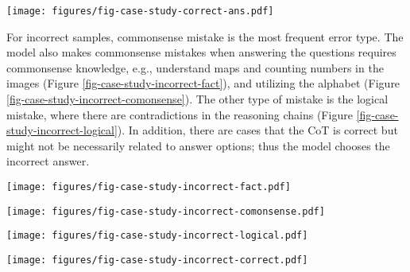 \documentclass[nohyperref]{article}
\theoremstyle{plain}
\theoremstyle{definition}
\theoremstyle{remark}
\begin{document}
\begin{figure*}[htb]
  \begin{center}
   \texttt{[image: figures/fig-case-study-correct-ans.pdf]}
  \end{center}
\caption{Examples of answers are correct while the CoT is correct (a) or incorrect (b).}
\label{fig-case-study-correct-ans}
\end{figure*}

For incorrect samples, commonsense mistake is the most frequent error type. The model also makes commonsense mistakes when answering the questions requires commonsense knowledge, e.g., understand maps and counting numbers in the images (Figure \ref{fig-case-study-incorrect-fact}), and utilizing the alphabet (Figure \ref{fig-case-study-incorrect-comonsense}). The other type of mistake is the logical mistake, where there are contradictions in the reasoning chains (Figure \ref{fig-case-study-incorrect-logical}). In addition, there are cases that the CoT is correct but might not be necessarily related to answer options; thus the model chooses the incorrect answer.

\begin{figure*}[htb]
  \begin{center}
   \texttt{[image: figures/fig-case-study-incorrect-fact.pdf]}
  \end{center}
\caption{Examples of commonsense mistakes about understanding maps and counting numbers.}
\label{fig-case-study-incorrect-fact}
\end{figure*}

\begin{figure*}[htb]
  \begin{center}
   \texttt{[image: figures/fig-case-study-incorrect-comonsense.pdf]}
  \end{center}
\caption{Examples of commonsense mistakes about utilizing alphabet.}
\label{fig-case-study-incorrect-comonsense}
\end{figure*}

\begin{figure*}[htb]
  \begin{center}
   \texttt{[image: figures/fig-case-study-incorrect-logical.pdf]}
  \end{center}
\caption{Examples of logical mistakes.}
\label{fig-case-study-incorrect-logical}
\end{figure*}

\begin{figure*}[htb]
  \begin{center}
   \texttt{[image: figures/fig-case-study-incorrect-correct.pdf]}
  \end{center}
\caption{Examples of answers are incorrect while the CoT is correct.}
\label{fig-case-study-incorrect-correct}
\end{figure*}
\end{document}
